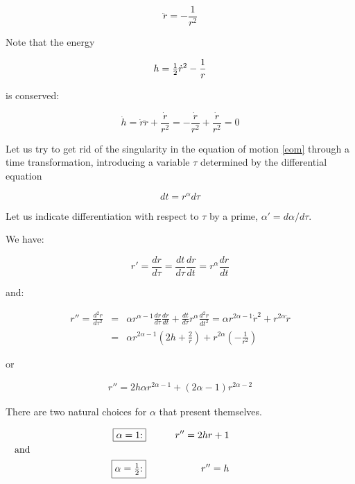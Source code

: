 \begin{equation}
\ddot{r} = - \frac{1}{r^2} \label{eom}
\end{equation}

Note that the energy

\begin{equation}
h = {\textstyle {1 \over 2}}\dot{r}^2 - \frac{1}{r} \label{energy}
\end{equation}

is conserved:

\begin{equation}
\dot h = \dot r \ddot r + \frac{\dot r}{r^2} =
         - \frac{\dot r}{r^2} + \frac{\dot r}{r^2} = 0
\end{equation}

Let us try to get rid of the singularity in the equation of motion \ref{eom}
through a time transformation, introducing a variable $\tau$
determined by the differential equation

\begin{equation}
dt = r^\alpha d\tau
\end{equation}

Let us indicate differentiation with respect to $\tau$ by a prime,
\ie $\alpha' = d\alpha/d\tau$.

We have:

\begin{equation}
r' = \frac{dr}{d\tau} = \frac{dt}{d\tau} \frac{dr}{dt} = r^\alpha \frac{dr}{dt}
\end{equation}

and:

\begin{eqnarray}
r''=\frac{d^2r}{d\tau^2} &=& \alpha r^{\alpha-1}\frac{dr}{d\tau}\frac{dr}{dt}
     + \frac{dt}{d\tau} r^\alpha \frac{d^2r}{dt^2}
= \alpha r^{2\alpha-1}\dot r^2 + r^{2\alpha} \ddot r \nonumber \\
&=& \alpha r^{2\alpha-1}\left(2h+\frac{2}{r}\right)
 + r^{2\alpha} \left(- \frac{1}{r^2}\right) 
\end{eqnarray}

or

\begin{eqnarray}
r'' = 2h\alpha r^{2\alpha-1} + (2\alpha-1)r^{2\alpha-2}
\end{eqnarray}

There are two natural choices for $\alpha$ that present themselves.

\begin{eqnarray}
\fbox{$\alpha=1$:}&\qquad& r''=2hr+1 \qquad\qquad\qquad\qquad\qquad\qquad \\
{\rm and}\qquad\qquad\qquad\qquad\qquad\qquad&\qquad& \nonumber \\
\fbox{$\alpha={\textstyle {1 \over 2}}$:}&\qquad& r''=h \qquad\qquad\qquad\qquad\qquad\qquad
\end{eqnarray}

